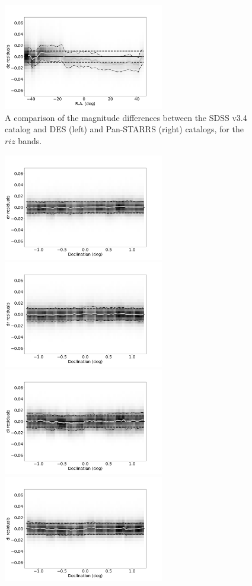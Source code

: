 \begin{figure}
    \centering\includegraphics[width=7cm]{figures/colorResidPSbright_dz_RA_Hess.png}
\caption{A comparison of the magnitude differences between the SDSS v3.4 catalog
and DES (left) and Pan-STARRS (right) catalogs, for the $riz$ bands.}
\label{fig:DESPSRA}
\end{figure}

\begin{figure}
    \centering\includegraphics[width=7cm]{figures/colorResidDES2bright_dr_Dec_Hess.png}
    \centering\includegraphics[width=7cm]{figures/colorResidPSbright_dr_Dec_Hess.png}
    \centering\includegraphics[width=7cm]{figures/colorResidDES2bright_di_Dec_Hess.png}
    \centering\includegraphics[width=7cm]{figures/colorResidPSbright_di_Dec_Hess.png}

\end{figure}
